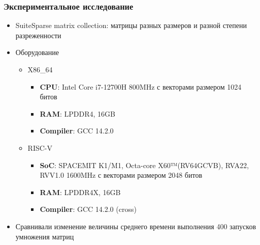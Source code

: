 \documentclass[xcolor=table,aspectratio=169]{beamer}
\begin{document}
\begin{frame}[t]
  \frametitle{Экспериментальное исследование}
  \begin{itemize}
    \item SuiteSparse matrix collection: матрицы разных размеров и разной степени разреженности
    \item Оборудование
    \begin{itemize}
    \item X86\_64
    \begin{itemize}
  \item \textbf{CPU}: Intel Core i7-12700H 800MHz с векторами размером 1024 битов
  \item \textbf{RAM}: LPDDR4, 16GB
  \item \textbf{Compiler}: GCC 14.2.0
\end{itemize}
    \item RISC-V
    \begin{itemize}
  \item \textbf{SoC}: SPACEMIT K1/M1, Octa-core X60™(RV64GCVB), RVA22, RVV1.0 1600MHz с векторами размером 2048 битов 
  \item \textbf{RAM}: LPDDR4X, 16GB 
  \item \textbf{Compiler}: GCC 14.2.0 (cross)
\end{itemize}
    \end{itemize}
    \item Сравнивали изменение величины среднего времени выполнения 400 запусков умножения матриц
  \end{itemize}  
\end{frame}
\end{document}
